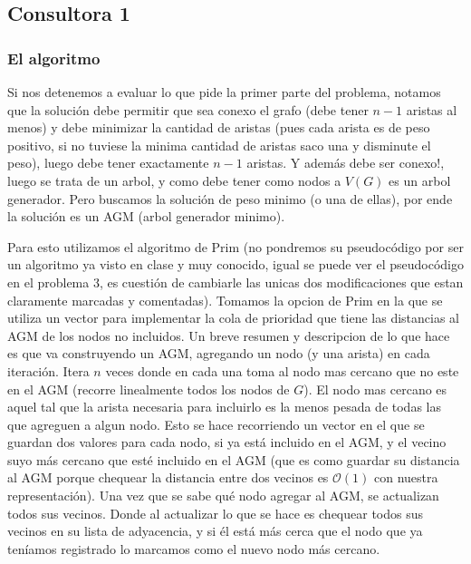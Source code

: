 \documentclass[A4paper,oneside,fleqn,11pt]{article}
\theoremstyle{definition}
\begin{document}
\subsection{Consultora 1}

\subsubsection{El algoritmo}
Si nos detenemos a evaluar lo que pide la primer parte del problema, notamos que la solución debe permitir que sea conexo el grafo (debe tener $n-1$ aristas al menos) y debe minimizar la cantidad de aristas (pues cada arista es de peso positivo, si no tuviese la minima cantidad de aristas saco una y disminute el peso), luego debe tener exactamente $n-1$ aristas. Y además debe ser conexo!, luego se trata de un arbol, y como debe tener como nodos a $V(G)$ es un arbol generador. Pero buscamos la solución de peso minimo (o una de ellas), por ende la solución es un AGM (arbol generador minimo). 

Para esto utilizamos el algoritmo de Prim (no pondremos su pseudocódigo por ser un algoritmo ya visto en clase y muy conocido, igual se puede ver el pseudocódigo en el problema 3, es cuestión de cambiarle las unicas dos modificaciones que estan claramente marcadas y comentadas). Tomamos la opcion de Prim en la que se utiliza un vector para implementar la cola de prioridad que tiene las distancias al AGM de los nodos no incluidos. Un breve resumen y descripcion de lo que hace es que va construyendo un AGM, agregando un nodo (y una arista) en cada iteración. Itera $n$ veces donde en cada una toma al nodo mas cercano que no este en el AGM (recorre linealmente todos los nodos de $G$). El nodo mas cercano es aquel tal que la arista necesaria para incluirlo es la menos pesada de todas las que agreguen a algun nodo. Esto se hace recorriendo un vector en el que se guardan dos valores para cada nodo, si ya está incluido en el AGM, y el vecino suyo más cercano que esté incluido en el AGM (que es como guardar su distancia al AGM porque chequear la distancia entre dos vecinos es $\mathcal{O} (1)$ con nuestra representación). Una vez que se sabe qué nodo agregar al AGM, se actualizan todos sus vecinos. Donde al actualizar lo que se hace es chequear todos sus vecinos en su lista de adyacencia, y si él está más cerca que el nodo que ya teníamos registrado lo marcamos como el nuevo nodo más cercano.
\end{document}
